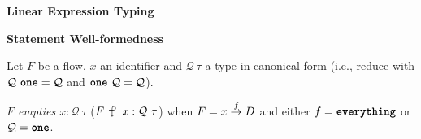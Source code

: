 \documentclass[10pt]{article}
\begin{document}
 \textbf{Linear Expression Typing}
\begin{mathpar}


\end{mathpar}


 \textbf{Statement Well-formedness}
\begin{mathpar}


\end{mathpar}


Let $F$ be a flow, $x$ an identifier and $\mathcal{Q}~\tau$ a type in canonical form (i.e., reduce with $\mathcal{Q}~\one = \mathcal{Q}$ and $\one~\mathcal{Q} = \mathcal{Q}$).
\begin{definition}
    \emph{$F$ empties $x : \mathcal{Q}~\tau$} (\emph{$F~\consumesarr~x:\mathcal{Q}~\tau$}) when $F = x \sends{f} D$ and either $f = \everything$ or $\mathcal{Q} = \one$.
\end{definition}
\end{document}
